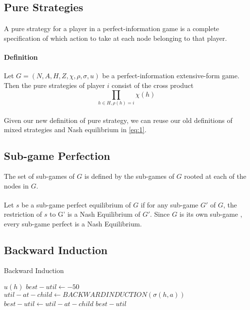\subsection{Pure Strategies}
\paragraph{} A pure strategy for a player in a perfect-information game is a complete specification of which action to take at each node belonging to that player.
\paragraph{Definition} Let $G = (N, A, H, Z,\chi ,\rho, \sigma, u ) $ be a perfect-information extensive-form game. Then the pure strategies of player $i$ consist of the cross product\\
\begin{equation}
\prod_{h \in H, \rho(h)=i}\chi(h)
\end{equation}

\paragraph{}
Given our new definition of pure strategy, we can reuse our old definitions of mixed strategies and Nash equilibrium in \ref{eq:1}.

\subsection{Sub-game Perfection}
\begin{mydef}\label{def:def555}
The set of sub-games of $G$ is defined by the sub-games of $G$ rooted at each of the nodes in $G$.
\end{mydef}
\paragraph{}Let $s$ be a  sub-game perfect equilibrium of $G$ if for any sub-game $G'$ of $G$, the restriction of $s$ to G' is a Nash Equilibrium of $G'$. Since $G$ is its own sub-game , every sub-game perfect is a Nash Equilibrium.

\subsection{Backward Induction}

\begin{algorithm}
\caption{Backward Induction\label{fig:scaled_back}}
\begin{algorithmic}
 \STATE $u(h)$
\ENDIF
\STATE $best-util \leftarrow -50$
\STATE $util-at-child \leftarrow BACKWARDINDUCTION(\sigma(h,a))$ 
\STATE $best-util \leftarrow util-at-child$
\ENDIF
\ENDFOR
\RETURN $best-util$
\end{algorithmic}
\end{algorithm}
